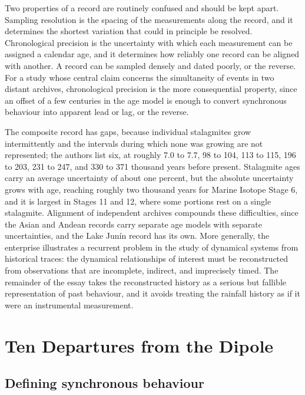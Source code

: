 \documentclass[11pt]{article}
\theoremstyle{definition}
\begin{document}
Two properties of a record are routinely confused and should be kept apart. Sampling resolution is the spacing of the measurements along the record, and it determines the shortest variation that could in principle be resolved. Chronological precision is the uncertainty with which each measurement can be assigned a calendar age, and it determines how reliably one record can be aligned with another. A record can be sampled densely and dated poorly, or the reverse. For a study whose central claim concerns the simultaneity of events in two distant archives, chronological precision is the more consequential property, since an offset of a few centuries in the age model is enough to convert synchronous behaviour into apparent lead or lag, or the reverse.

The composite record has gaps, because individual stalagmites grow intermittently and the intervals during which none was growing are not represented; the authors list six, at roughly 7.0 to 7.7, 98 to 104, 113 to 115, 196 to 203, 231 to 247, and 330 to 371 thousand years before present. Stalagmite ages carry an average uncertainty of about one percent, but the absolute uncertainty grows with age, reaching roughly two thousand years for Marine Isotope Stage 6, and it is largest in Stages 11 and 12, where some portions rest on a single stalagmite. Alignment of independent archives compounds these difficulties, since the Asian and Andean records carry separate age models with separate uncertainties, and the Lake Junín record has its own. More generally, the enterprise illustrates a recurrent problem in the study of dynamical systems from historical traces: the dynamical relationships of interest must be reconstructed from observations that are incomplete, indirect, and imprecisely timed. The remainder of the essay takes the reconstructed history as a serious but fallible representation of past behaviour, and it avoids treating the rainfall history as if it were an instrumental measurement.

\section{Ten Departures from the Dipole}

\subsection{Defining synchronous behaviour}
\end{document}
